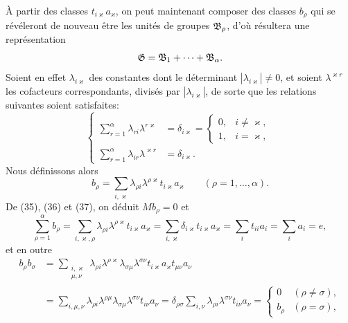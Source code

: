 À partir des classes $t_{i\varkappa}a_\varkappa$, on peut maintenant composer des classes $b_\rho$ qui se révéleront de nouveau être les unités de groupes $\mathfrak{B}_\rho$, d'où résultera une représentation
\[
 \mathfrak{G}=\mathfrak{B}_1+\cdots+\mathfrak{B}_\alpha.
\]
Soient en effet $\lambda_{i\varkappa}$ des constantes dont le déterminant $|\lambda_{i\varkappa}|\ne0$, et soient $\lambda^{\varkappa r}$ les cofacteurs correspondants, divisés par $|\lambda_{i\varkappa}|$, de sorte que les relations suivantes soient satisfaites:
\begin{equation}
\left\{
\begin{aligned}
 \sum_{r=1}^{\alpha}\lambda_{ri}\lambda^{r\varkappa}&=\delta_{i\varkappa}=\begin{cases}0,&i\ne\varkappa,\\1,&i=\varkappa,
 \end{cases}\\
 \sum_{r=1}^{\alpha}\lambda_{ir}\lambda^{\varkappa r}&=\delta_{i\varkappa}.
\end{aligned}\right.
\tag{36}
\end{equation}
Nous définissons alors
\begin{equation}
 b_\rho=\sum_{i,\varkappa}\lambda_{\rho i}\lambda^{\rho\varkappa}t_{i\varkappa}a_\varkappa
 \qquad(\rho=1,\ldots,\alpha).
\tag{37}
\end{equation}
De (35), (36) et (37), on déduit $Mb_\rho=0$ et
\begin{equation}
 \sum_{\rho=1}^{\alpha}b_\rho
 =\sum_{i,\varkappa,\rho}\lambda_{\rho i}\lambda^{\rho\varkappa}t_{i\varkappa}a_\varkappa
 =\sum_{i,\varkappa}\delta_{i\varkappa}t_{i\varkappa}a_\varkappa
 =\sum_i t_{ii}a_i=\sum_i a_i=e,
\tag{38}
\end{equation}
et en outre
\[
\begin{aligned}
 b_\rho b_\sigma
 &=\sum_{\substack{i,\varkappa\\ \mu,\nu}}
  \lambda_{\rho i}\lambda^{\rho\varkappa}\lambda_{\sigma\mu}\lambda^{\sigma\nu}
  t_{i\varkappa}a_\varkappa t_{\mu\nu}a_\nu \\
 &=\sum_{i,\mu,\nu}\lambda_{\rho i}\lambda^{\rho\mu}\lambda_{\sigma\mu}\lambda^{\sigma\nu}t_{i\nu}a_\nu
 =\delta_{\rho\sigma}\sum_{i,\nu}\lambda_{\rho i}\lambda^{\sigma\nu}t_{i\nu}a_\nu
 =\begin{cases}0&(\rho\ne\sigma),\\ b_\rho&(\rho=\sigma),\end{cases}
\end{aligned}
\]
